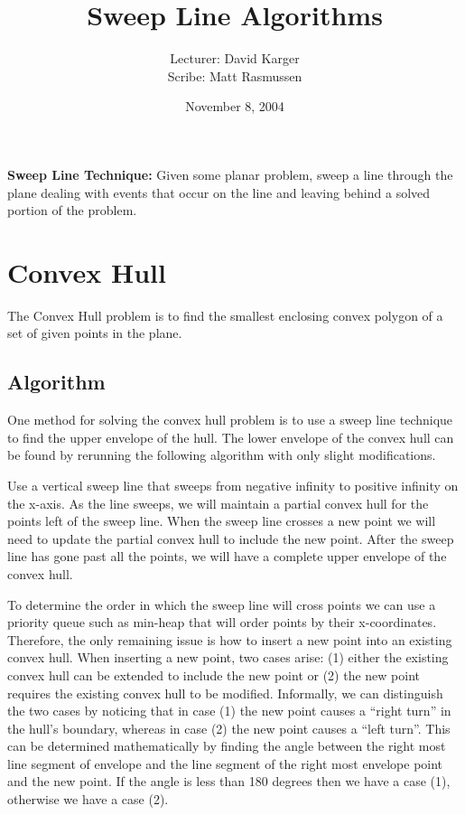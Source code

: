 \documentclass{article}
\title{Sweep Line Algorithms}
\date{November 8, 2004}
\author{Lecturer: David Karger\\ Scribe: Matt Rasmussen}
\begin{document}
\begin{definition}
  \textbf{Sweep Line Technique:} Given some planar problem, sweep a line
through the plane dealing with events that occur on the line and leaving behind a
solved portion of the problem.
\end{definition}


\section{Convex Hull}

The Convex Hull problem is to find the smallest enclosing convex polygon of a
set of given points in the plane.

\subsection{Algorithm}

One method for solving the convex hull problem is to use a sweep line technique
to find the upper envelope of the hull.  The lower envelope of the convex hull
can be found by rerunning the following algorithm with only slight
modifications.   

Use a vertical sweep line that sweeps from negative infinity to positive
infinity on the x-axis.  As the line sweeps, we will maintain a partial convex
hull for the points left of the sweep line.  When the sweep line crosses a new
point we will need to update the partial convex hull to include the new point.
After the sweep line has gone past all the points, we will have a complete upper
envelope of the convex hull.

To determine the order in which the sweep line will cross points we can use a
priority queue such as min-heap that will order points by their x-coordinates. 
Therefore, the only remaining issue is how to insert a new point into an
existing convex hull. When inserting a new point, two cases arise: (1) either
the existing convex hull can be extended to include the new point or (2) the
new point requires the existing convex hull to be modified.  Informally, we can
distinguish the two cases by noticing that in case (1) the new point causes a
``right turn'' in the hull's boundary, whereas in case (2) the new point causes
a ``left turn''. This can be determined mathematically by finding the angle
between the right most line segment of envelope and the line segment of the
right most envelope point and the new point.  If the angle is less than
180  degrees then we have a case (1), otherwise we have a case (2).
\end{document}

